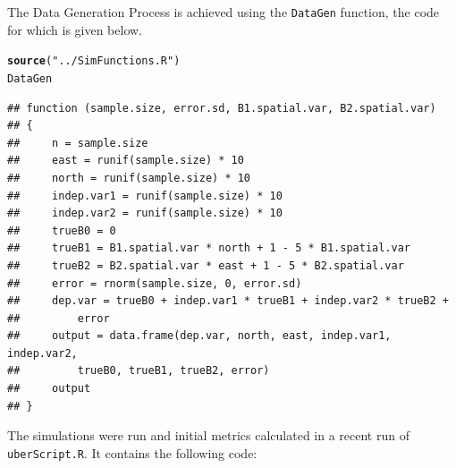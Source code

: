 \documentclass{article}\usepackage{graphicx, color}
\makeatletter
\newcommand{\hlfunctioncall}[1]{\textcolor[rgb]{0.501960784313725,0,0.329411764705882}{\textbf{#1}}}%
\newcommand{\hlstring}[1]{\textcolor[rgb]{0.6,0.6,1}{#1}}%
\newenvironment{kframe}{%
 \def\at@end@of@kframe{}%
 \ifinner\ifhmode%
  \def\at@end@of@kframe{\end{minipage}}%
  \begin{minipage}{\columnwidth}%
 \fi\fi%
 \def\FrameCommand##1{\hskip\@totalleftmargin \hskip-\fboxsep
 \colorbox{shadecolor}{##1}\hskip-\fboxsep
     \hskip-\linewidth \hskip-\@totalleftmargin \hskip\columnwidth}%
 \MakeFramed {\advance\hsize-\width
   \@totalleftmargin\z@ \linewidth\hsize
   \@setminipage}}%
 {\par\unskip\endMakeFramed%
 \at@end@of@kframe}
\newenvironment{knitrout}{}{} %
\makeatother
\begin{document}
The Data Generation Process is achieved using the \texttt{DataGen} function, the code for which is given below. 
\begin{knitrout}
\color{fgcolor}\begin{kframe}
\begin{alltt}
\hlfunctioncall{source}(\hlstring{"../SimFunctions.R"})
DataGen
\end{alltt}
\begin{verbatim}
## function (sample.size, error.sd, B1.spatial.var, B2.spatial.var) 
## {
##     n = sample.size
##     east = runif(sample.size) * 10
##     north = runif(sample.size) * 10
##     indep.var1 = runif(sample.size) * 10
##     indep.var2 = runif(sample.size) * 10
##     trueB0 = 0
##     trueB1 = B1.spatial.var * north + 1 - 5 * B1.spatial.var
##     trueB2 = B2.spatial.var * east + 1 - 5 * B2.spatial.var
##     error = rnorm(sample.size, 0, error.sd)
##     dep.var = trueB0 + indep.var1 * trueB1 + indep.var2 * trueB2 + 
##         error
##     output = data.frame(dep.var, north, east, indep.var1, indep.var2, 
##         trueB0, trueB1, trueB2, error)
##     output
## }
\end{verbatim}
\end{kframe}
\end{knitrout}


The simulations were run and initial metrics calculated in a recent run of \texttt{uberScript.R}. It contains the following code:
\end{document}

